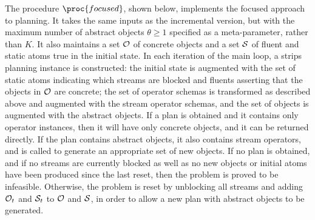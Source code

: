 \documentclass[letterpaper]{article} %
\newcommand\note[1]{\todo[inline, color=blue!10, linecolor=blue!90,
  size=\footnotesize]{\linespread{0.9}\selectfont{{\bf CRG:} #1}\par}}
\theoremstyle{plain}\newtheorem{thm}{Theorem}
\theoremstyle{definition}\newtheorem{defn}{Definition}
\theoremstyle{plain}\newtheorem{lem}{Lemma}
\theoremstyle{plain}\newtheorem{cor}{Corollary}
\newcommand{\strips}{{\sc strips}}
\newcommand{\eager}{incremental}
\newcommand{\focused}{focused}
\begin{document}

The procedure $\proc{\focused{}}$, shown below, implements the \focused{}
approach to planning.  It takes the same inputs as the \eager{}
version, but with the maximum number of abstract objects $\theta \geq 1$
specified as a meta-parameter, rather than $K$.  It also maintains a set ${\cal O}$ of
concrete objects and a set ${\cal S}$ of fluent and static atoms true in the
initial state.
In each iteration of the main loop, a
\strips{} planning instance is constructed: the initial state is
augmented with the set of static atoms indicating which streams are
blocked and fluents asserting that the objects in ${\cal O}$ are
concrete; the set of operator schemas is transformed as described above
and augmented with the stream operator schemas, and the set of objects
is augmented with the abstract objects.  If a plan is obtained and it
contains only operator instances, then it will have only concrete
objects, and it can be returned directly.  If the plan contains abstract objects, it also contains stream
operators, and 
is called to generate an appropriate set of new objects.  If no plan
is obtained, and if no streams are currently blocked as well as no new objects
or initial atoms have been produced since the last reset, then the problem
is proved to be infeasible.  
Otherwise, the problem is reset by unblocking all streams and adding
${\cal O}_t$ and ${\cal S}_t$ to ${\cal O}$ and ${\cal S}$, in order to allow
a new plan with abstract objects to be generated.
\end{document}
